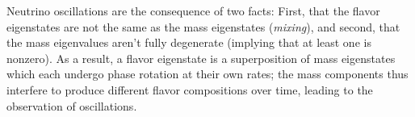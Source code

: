 \documentclass[../thesis.tex]{subfiles}
\begin{document}
Neutrino oscillations are the consequence of two facts: First, that the flavor eigenstates are not the same as the mass eigenstates (\emph{mixing}), and second, that the mass eigenvalues aren't fully degenerate (implying that at least one is nonzero). As a result, a flavor eigenstate is a superposition of mass eigenstates which each undergo phase rotation at their own rates; the mass components thus interfere to produce different flavor compositions over time, leading to the observation of oscillations.

\newcommand\upmns{\ensuremath{%
    U_\mathrm{PMNS}}}
\newcommand\flavcol{\ensuremath{%
    \begin{pmatrix} {\nu_e} \\ {\nu_\mu} \\ {\nu_\tau} \end{pmatrix}}}
\newcommand\masscol{\ensuremath{%
    \begin{pmatrix} \nu_1 \\ \nu_2 \\ \nu_3 \end{pmatrix}}}
\newcommand\upmnsSimple{\ensuremath{%
    \begin{pmatrix} U_{e 1} & U_{e 2} & U_{e 3} \\ U_{\mu 1} & U_{\mu 2} & U_{\mu 3} \\ U_{\tau 1} & U_{\tau 2} & U_{\tau 3} \end{pmatrix}}}
\newcommand\cee[1]{\ensuremath{%
     c_{#1}}}
\newcommand\ess[1]{\ensuremath{%
     s_{#1}}}
\newcommand\upmnsFactored{\ensuremath{%
    \begin{pmatrix} 1 & 0 & 0 \\ 0 & \cee{23} & \ess{23} \\ 0 & -\ess{23} & \cee{23} \end{pmatrix}%
    \begin{pmatrix} \cee{13} & 0 & \ess{13}e^{-i\delta_\text{CP}} \\ 0 & 1 & 0 \\ -\ess{13}e^{i\delta_\text{CP}} & 0 & \cee{13} \end{pmatrix}%
    \begin{pmatrix} \cee{12} & \ess{12} & 0 \\ -\ess{12} & \cee{12} & 0 \\ 0 & 0 & 1 \end{pmatrix}}}
\newcommand\upmnsFull{\ensuremath{%
    \begin{pmatrix} c_{12}c_{13} & s_{12} c_{13} & s_{13}e^{-i\delta_\text{CP}} \\%
      -s_{12}c_{23} - c_{12}s_{23}s_{13}e^{i\delta_\text{CP}} & c_{12}c_{23} - s_{12}s_{23}s_{13}e^{i\delta_\text{CP}} & s_{23}c_{13}\\%
      s_{12}s_{23} - c_{12}c_{23}s_{13}e^{i\delta_\text{CP}} & -c_{12}s_{23} - s_{12}c_{23}s_{13}e^{i\delta_\text{CP}} & c_{23}c_{13} \end{pmatrix}}}
\newcommand*\mathcmd[2]{\newcommand#1{\ensuremath{#2}}}
\mathcmd{\tAB}{\theta_{12}}
\mathcmd{\tBC}{\theta_{23}}
\mathcmd{\tAC}{\theta_{13}}
\mathcmd{\dcp}{\delta_{CP}}
\end{document}
